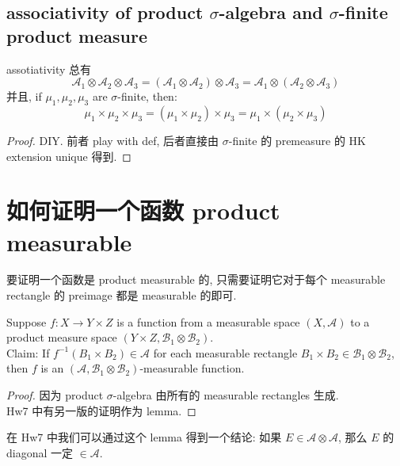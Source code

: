 \documentclass[lang=cn,11pt]{elegantbook}
\begin{document}
\subsection{associativity of product $\sigma$-algebra and $\sigma$-finite product measure}
\begin{corollary}{assotiativity}
总有 $$ \mathcal{A}_1 \otimes \mathcal{A}_2  \otimes \mathcal{A}_3 =  (\mathcal{A}_1 \otimes \mathcal{A}_2)  \otimes \mathcal{A}_3 =   \mathcal{A}_1 \otimes (\mathcal{A}_2  \otimes \mathcal{A}_3 ) $$ 并且, if $\mu_1, \mu_2,\mu_3$ are $\sigma$-finite, then: $$\mu_1 \times \mu_2 \times \mu_3 = (\mu_1 \times \mu_2) \times \mu_3  = \mu_1 \times (\mu_2 \times \mu_3 )$$
\end{corollary}
\begin{proof}
    DIY. 前者 play with def, 后者直接由 $\sigma$-finite 的 premeasure 的 HK extension unique 得到. 
\end{proof}


\section{如何证明一个函数 product measurable}

要证明一个函数是 product measurable 的, 只需要证明它对于每个  measurable rectangle 的 preimage 都是 measurable 的即可.
\begin{lemma}
    Suppose $f: X\to Y\times Z$ is a function from a measurable space $(X,\mathcal{A})$ to a product measure space $(Y\times Z, \mathcal{B}_1 \otimes \mathcal{B}_2)$.\\
  Claim: If $f^{-1}(B_1 \times B_2)\in\mathcal{A}$ for each measurable rectangle $B_1 \times B_2 \in \mathcal{B}_1 \otimes \mathcal{B}_2$, then $f$ is an $(\mathcal{A}, \mathcal{B}_1 \otimes \mathcal{B}_2)$-measurable function.
\end{lemma}
\begin{proof}
    因为 product $\sigma$-algebra 由所有的 measurable rectangles 生成. \\
    Hw7 中有另一版的证明作为 lemma.
\end{proof}
在 Hw7 中我们可以通过这个 lemma 得到一个结论: 如果 $E \in \mathcal{A\otimes A}$, 那么 $E$ 的 diagonal 一定 $\in \mathcal{A}$.
\end{document}
